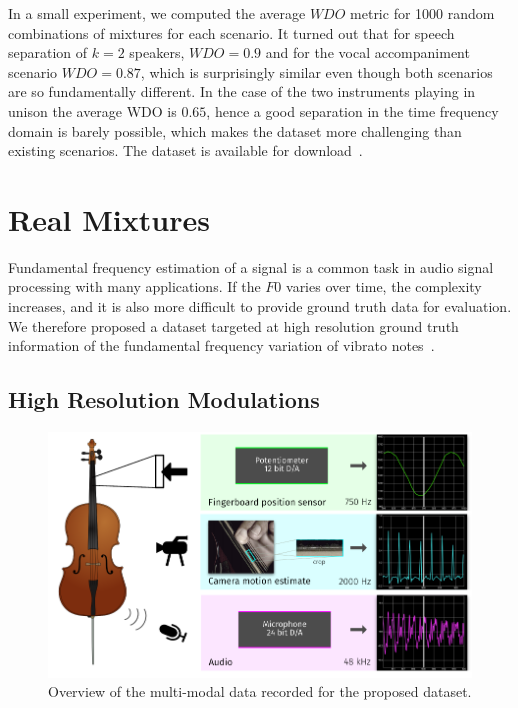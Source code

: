 In a small experiment, we computed the average \(WDO\) metric for 1000 random combinations of mixtures for each scenario.
It turned out that for speech separation of \(k=2\) speakers, \(WDO=0.9\) and for the vocal accompaniment scenario \(WDO=0.87\), which is surprisingly similar even though both scenarios are so fundamentally different.
In the case of the two instruments playing in unison the average WDO is \(0.65\), hence a good separation in the time frequency domain is barely possible, which makes the dataset more challenging than existing scenarios.
The dataset is available for download~\cite{oss_unison}.


\section{Real Mixtures}

Fundamental frequency estimation of a signal is a common task in audio signal processing with many applications. 
If the $F0$ varies over time, the complexity increases, and it is also more difficult to provide ground truth data for evaluation.
We therefore proposed a dataset targeted at high resolution ground truth information of the fundamental frequency variation of vibrato notes~\cite{stoeter15acm}.

\subsection{High Resolution Modulations}


\begin{figure}[h]
  \centering
  \includegraphics[width=\textwidth]{Chapters/04_Data/figures/teaser.pdf}
  \caption{Overview of the multi-modal data recorded for the proposed dataset.}
\label{fig:teaser}
\end{figure}

